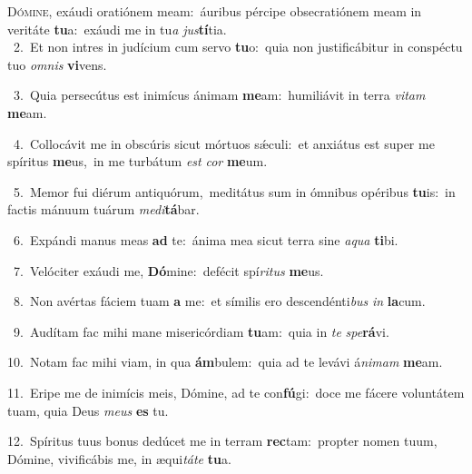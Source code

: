 \lettrine{\initial\textcolor{\initialcolor}{D}}{ómine,} exáudi oratiónem meam:~\dagger áuribus pércipe obsecratiónem meam in veritáte \textbf{tu}\-a:~\star exáudi me in tu\textit{a} \textit{jus}\-\textbf{tí}tia.\\
{\numbfont\textcolor{\numbcolor}{~2.}}~Et non intres in judícium cum servo \textbf{tu}\-o:~\star quia non justificábitur in conspéctu tuo \textit{om}\-\textit{nis} \textbf{vi}\-vens.\par
{\numbfont\textcolor{\numbcolor}{~3.}}~Quia persecútus est inimícus ánimam \textbf{me}\-am:~\star humiliávit in terra \textit{vi}\-\textit{tam} \textbf{me}\-am.\par
{\numbfont\textcolor{\numbcolor}{~4.}}~Collocávit me in obscúris sicut mórtuos sǽculi:~\dagger et anxiátus est super me spíritus \textbf{me}\-us,~\star in me turbátum \textit{est} \textit{cor} \textbf{me}\-um.\par
{\numbfont\textcolor{\numbcolor}{~5.}}~Memor fui diérum antiquórum,~\dagger meditátus sum in ómnibus opéribus \textbf{tu}\-is:~\star in factis mánuum tuárum \textit{me}\-\textit{di}\textbf{tá}bar.\par
{\numbfont\textcolor{\numbcolor}{~6.}}~Expándi manus meas \textbf{ad} te:~\star ánima mea sicut terra sine \textit{a}\-\textit{qua} \textbf{ti}\-bi.\par
{\numbfont\textcolor{\numbcolor}{~7.}}~Velóciter exáudi me, \textbf{Dó}\-mine:~\star defécit spí\-\textit{ri}\-\textit{tus} \textbf{me}\-us.\par
{\numbfont\textcolor{\numbcolor}{~8.}}~Non avértas fáciem tuam \textbf{a} me:~\star et símilis ero descendénti\textit{bus} \textit{in} \textbf{la}\-cum.\par
{\numbfont\textcolor{\numbcolor}{~9.}}~Audítam fac mihi mane misericórdiam \textbf{tu}\-am:~\star quia in \textit{te} \textit{spe}\-\textbf{rá}vi.\par
{\numbfont\textcolor{\numbcolor}{10.}}~Notam fac mihi viam, in qua \textbf{ám}\-bulem:~\star quia ad te levávi á\-\textit{ni}\-\textit{mam} \textbf{me}\-am.\par
{\numbfont\textcolor{\numbcolor}{11.}}~Eripe me de inimícis meis, Dómine, ad te con\-\textbf{fú}\-gi:~\star doce me fácere voluntátem tuam, quia Deus \textit{me}\-\textit{us} \textbf{es} tu.\par
{\numbfont\textcolor{\numbcolor}{12.}}~Spíritus tuus bonus dedúcet me in terram \textbf{rec}\-tam:~\star propter nomen tuum, Dómine, vivificábis me, in æqui\-\textit{tá}\-\textit{te} \textbf{tu}\-a.\par
